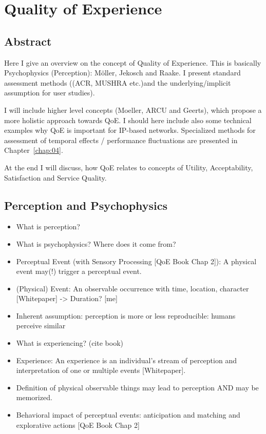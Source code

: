 \chapter{Quality of Experience}
\section*{Abstract}
Here I give an overview on the concept of Quality of Experience.
This is basically Psychophysics (Perception): Möller, Jekosch and Raake.
I present standard assessment methods ((ACR, MUSHRA etc.)and the underlying/implicit assumption for user studies).

I will include higher level concepts (Moeller, ARCU and Geerts), which propose a more holistic approach towards QoE.
I should here include also some technical examples why QoE is important for IP-based networks.
Specialized methods for assessment of temporal effects / performance fluctuations are presented in Chapter~\ref{chap:04}.

At the end I will discuss, how QoE relates to concepts of Utility, Acceptability, Satisfaction and Service Quality.

\section{Perception and Psychophysics}
\begin{itemize}
\item What is perception?
\item What is psychophysics? Where does it come from?
\item Perceptual Event (with Sensory Processing [QoE Book Chap 2]): A physical event may(!) trigger a perceptual event.
\item (Physical) Event: An observable occurrence with time, location, character [Whitepaper] -> Duration? [me]
\item Inherent assumption: perception is more or less reproducible: humans perceive similar

\item What is experiencing? (cite book)
\item Experience: An experience is an individual's stream of perception and interpretation of one or multiple events [Whitepaper].
\item Definition of physical observable things may lead to perception AND may be memorized.
\item Behavioral impact of perceptual events: anticipation and matching and explorative actions [QoE Book Chap 2]
\end{itemize}

